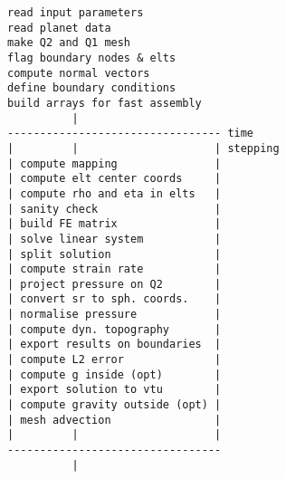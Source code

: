 
\begin{verbatim}
read input parameters
read planet data
make Q2 and Q1 mesh
flag boundary nodes & elts
compute normal vectors
define boundary conditions
build arrays for fast assembly
          |
--------------------------------- time
|         |                     | stepping
| compute mapping               |
| compute elt center coords     |
| compute rho and eta in elts   |
| sanity check                  |
| build FE matrix               |
| solve linear system           |
| split solution                |
| compute strain rate           |
| project pressure on Q2        |
| convert sr to sph. coords.    |
| normalise pressure            |
| compute dyn. topography       |
| export results on boundaries  |
| compute L2 error              |
| compute g inside (opt)        |
| export solution to vtu        |
| compute gravity outside (opt) |
| mesh advection                |
|         |                     |
---------------------------------
          | 
\end{verbatim}

